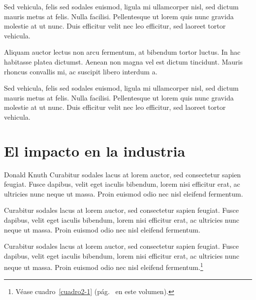 Sed vehicula, felis sed sodales euismod, ligula mi ullamcorper nisl, sed dictum mauris metus at felis. Nulla facilisi. Pellentesque ut lorem quis nunc gravida molestie at ut nunc. Duis efficitur velit nec leo efficitur, sed laoreet tortor vehicula.

Aliquam auctor lectus non arcu fermentum, at bibendum tortor luctus. In hac habitasse platea dictumst. Aenean non magna vel est dictum tincidunt. Mauris rhoncus convallis mi, ac suscipit libero interdum a.

Sed vehicula, felis sed sodales euismod, ligula mi ullamcorper nisl, sed dictum mauris metus at felis. Nulla facilisi. Pellentesque ut lorem quis nunc gravida molestie at ut nunc. Duis efficitur velit nec leo efficitur, sed laoreet tortor vehicula.

\section{El impacto en la industria}

Donald Knuth Curabitur sodales lacus at lorem auctor, sed consectetur sapien feugiat. Fusce dapibus, velit eget iaculis bibendum, lorem nisi efficitur erat, ac ultricies nunc neque ut massa. Proin euismod odio nec nisl eleifend fermentum.

Curabitur sodales lacus at lorem auctor, sed consectetur sapien feugiat. Fusce dapibus, velit eget iaculis bibendum, lorem nisi efficitur erat, ac ultricies nunc neque ut massa. Proin euismod odio nec nisl eleifend fermentum.

Curabitur sodales lacus at lorem auctor, sed consectetur sapien feugiat. Fusce dapibus, velit eget iaculis bibendum, lorem nisi efficitur erat, ac ultricies nunc neque ut massa. Proin euismod odio nec nisl eleifend fermentum.\footnote{Véase cuadro~\ref{cuadro2-1} (pág.~\pageref{cuadro2-1} en este volumen).}


